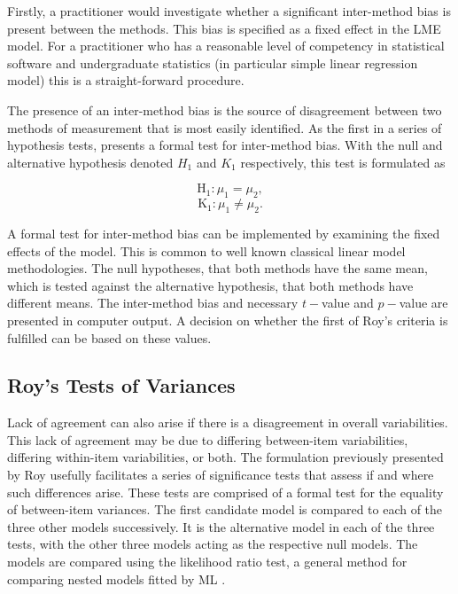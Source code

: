 \documentclass[12pt, a4paper]{report}
\theoremstyle{plain}
\theoremstyle{definition}
\theoremstyle{remark}
\begin{document}
	Firstly, a practitioner would investigate whether a significant inter-method bias is present between the methods. This bias is specified as a fixed effect in the LME model.  For a practitioner who has a reasonable level of competency in statistical software and undergraduate statistics (in particular simple linear regression model) this is a straight-forward procedure.
	
	The presence of an inter-method bias is the source of disagreement between two methods of measurement that is most easily identified. As the first in a series of hypothesis tests, \citet{ARoy2009} presents a formal test for inter-method bias. With the null and alternative hypothesis denoted $H_1$ and $K_1$ respectively, this test is formulated as
	
	\[	\operatorname{H_1} : \mu_1 = \mu_2 ,\]
	\[	\operatorname{K_1} : \mu_1 \neq \mu_2.\]
	
	
A formal test for inter-method bias can be implemented by examining the fixed effects of the model. This is common to well known classical linear model methodologies. The null hypotheses, that both methods have the same mean, which is tested against the alternative hypothesis, that both methods have different means. The inter-method bias and necessary $t-$value and $p-$value are presented in computer output. A decision on whether the first of Roy's criteria is fulfilled can be based on these values.
	

\subsection{Roy's Tests of Variances}
	
Lack of agreement can also arise if there is a disagreement in overall variabilities. This lack of agreement may be due to differing between-item variabilities, differing within-item variabilities, or both. The formulation previously presented by Roy usefully facilitates a series of significance tests that assess if and where such differences arise. These tests are comprised of a formal test for the equality of between-item variances. The first candidate model is compared to each of the three other models successively. It is the alternative model in each of the three tests, with the other three models acting as the respective null models. The models are compared using the likelihood ratio test, a general method for comparing nested models fitted by ML \citep{Lehmann2006}.
		
\end{document}
